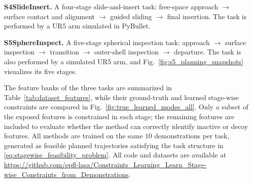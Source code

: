\documentclass[lettersize,journal]{IEEEtran}
\newcommand{\NA}{\cellcolor{gray!18}}
\newcommand{\NoAct}{--}
\begin{document}
\textbf{S4SlideInsert.} A four-stage slide-and-insert task: free-space approach $\rightarrow$ surface contact and alignment $\rightarrow$ guided sliding $\rightarrow$ final insertion.
The task is performed by a UR5 arm simulated in PyBullet.

\textbf{S5SphereInspect.} A five-stage spherical inspection task: approach $\rightarrow$ surface inspection $\rightarrow$ transition $\rightarrow$ outer-shell inspection $\rightarrow$ departure.
The task is also performed by a simulated UR5 arm, and Fig.~\ref{fig:s5_planning_snapshots} visualizes its five stages.

The feature banks of the three tasks are summarized in Table~\ref{tab:dataset_features}, while their ground-truth and learned stage-wise constraints are compared in Fig.~\ref{fig:true_learned_modes_all}. Only a subset of the exposed features is constrained in each stage; the remaining features are included to evaluate whether the method can correctly identify inactive or decoy features. All methods are trained on the same
$10$ demonstrations per task, generated as feasible planned trajectories satisfying the task structure in
\eqref{eq:stagewise_feasibility_problem}. All code and datasets are available at
\url{https://github.com/epfl-lasa/Constraints_Learning_Learn_Stage-wise_Constraints_from_Demonstrations}.




\end{document}

